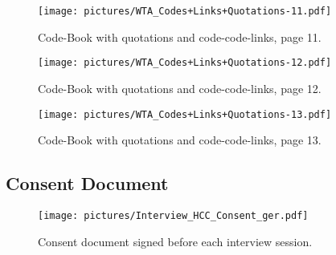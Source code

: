 \documentclass{article}
\begin{document}
\begin{figure*}[h!]
  \centering
  \texttt{[image: pictures/WTA\_Codes+Links+Quotations-11.pdf]}
  \caption{\label{fig:WTApage11}%
           Code-Book with quotations and code-code-links, page 11.}
\end{figure*}

\begin{figure*}[h!]
  \centering
  \texttt{[image: pictures/WTA\_Codes+Links+Quotations-12.pdf]}
  \caption{\label{fig:WTApage12}%
           Code-Book with quotations and code-code-links, page 12.}
\end{figure*}

\begin{figure*}[h!]
  \centering
  \texttt{[image: pictures/WTA\_Codes+Links+Quotations-13.pdf]}
  \caption{\label{fig:WTApage13}%
           Code-Book with quotations and code-code-links, page 13.}
\end{figure*}
 
\clearpage 
 
\subsection{Consent Document}

\begin{figure*}[h!]
  \centering
  \texttt{[image: pictures/Interview\_HCC\_Consent\_ger.pdf]}
  \caption{\label{fig:consent}%
           Consent document signed before each interview session.}
\end{figure*}
\end{document}
